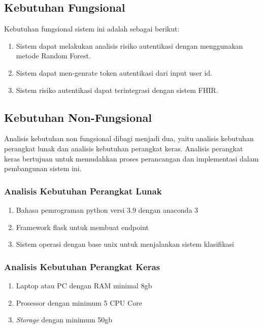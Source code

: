 \subsection{Kebutuhan Fungsional}
Kebutuhan fungsional sistem ini adalah sebagai berikut:
\begin{enumerate}
    \item Sistem dapat melakukan analisis risiko autentikasi dengan menggunakan metode Random Forest.
    \item Sistem dapat men-genrate token autentikasi dari input user id.
    \item Sistem risiko autentikasi dapat terintegrasi dengan sistem FHIR.
\end{enumerate}

\subsection{Kebutuhan Non-Fungsional}
Analisis kebutuhan non fungsional dibagi menjadi dua, yaitu analisis
kebutuhan perangkat lunak dan analisis kebutuhan perangkat keras. Analisis
perangkat keras bertujuan untuk memudahkan proses perancangan dan
implementasi dalam pembangunan sistem ini.

\subsubsection{Analisis Kebutuhan Perangkat Lunak}

\begin{enumerate}
    \item Bahasa pemrograman python versi 3.9 dengan anaconda 3
    \item Framework flask untuk membuat endpoint 
    \item Sistem operasi dengan base unix untuk menjalankan sistem klasifikasi
\end{enumerate}

\subsubsection{Analisis Kebutuhan Perangkat Keras}
\begin{enumerate}
    \item Laptop atau PC dengan RAM minimal 8gb
    \item Prosessor dengan minimum 5 CPU Core 
    \item \textit{Storage} dengan minimum 50gb
\end{enumerate}

